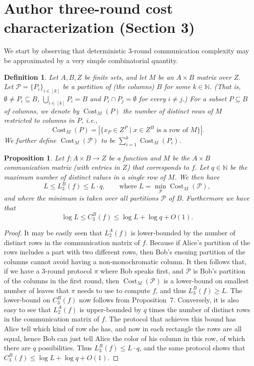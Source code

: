 \documentclass[10pt,a4paper]{article}
\newtheorem{definition}[theorem]{Definition}
\newtheorem{proposition}[theorem]{Proposition}
\begin{document}
\section*{Author three-round cost characterization (Section 3)}
We start by observing that deterministic 3-round communication complexity may be approximated by a very simple combinatorial quantity.
\begin{definition}
Let $A,B,Z$ be finite sets, and let $M$ be an $A\times B$ matrix over $Z$. Let $\mathcal P=\{P_i\}_{i\in[k]}$ be a partition of (the columns) $B$ for some $k\in\mathbb N$. (That is, $\emptyset\ne P_i\subseteq B$, $\bigcup_{i\in[k]}P_i=B$ and $P_i\cap P_j=\emptyset$ for every $i\ne j$.) For a subset $P\subseteq B$ of columns, we denote by $\operatorname{Cost}_M(P)$ the number of distinct rows of $M$ restricted to columns in $P$, i.e.,
\[\operatorname{Cost}_M(P)=|\{x_P\in Z^P\mid x\in Z^B\text{ is a row of }M\}|.\]
We further define $\operatorname{Cost}_M(\mathcal P)$ to be $\sum_{i=1}^k\operatorname{Cost}_M(P_i)$.
\end{definition}
\begin{proposition}\label{prop:cost}
Let $f:A\times B\to Z$ be a function and $M$ be the $A\times B$ communication matrix (with entries in $Z$) that corresponds to $f$. Let $q\in\mathbb N$ be the maximum number of distinct values in a single row of $M$. We then have
\[ L\le L_3^B(f)\le L\cdot q,\qquad\text{where }L=\min_{\mathcal P}\operatorname{Cost}_M(\mathcal P),\]
and where the minimum is taken over all partitions $\mathcal P$ of $B$. Furthermore we have that
\[\log L\le C_3^B(f)\le\log L+\log q+O(1).\]
\end{proposition}
\begin{proof}
It may be easily seen that $L_2^A(f)$ is lower-bounded by the number of distinct rows in the communication matrix of $f$. Because if Alice's partition of the rows includes a part with two different rows, then Bob's ensuing partition of the columns cannot avoid having a non-monochromatic column. It then follows that, if we have a 3-round protocol $\pi$ where Bob speaks first, and $\mathcal P$ is Bob's partition of the columns in the first round, then $\operatorname{Cost}_M(\mathcal P)$ is a lower-bound on smallest number of leaves that $\pi$ needs to use to compute $f$, and thus $L_3^B(f)\ge L$. The lower-bound on $C_3^B(f)$ now follows from Proposition~7.
Conversely, it is also easy to see that $L_2^A(f)$ is upper-bounded by $q$ times the number of distinct rows in the communication matrix of $f$. The protocol that achieves this bound has Alice tell which kind of row she has, and now in each rectangle the rows are all equal, hence Bob can just tell Alice the color of his column in this row, of which there are $q$ possibilities. Thus $L_3^B(f)\le L\cdot q$, and the same protocol shows that $C_3^B(f)\le\log L+\log q+O(1)$.
\end{proof}
\end{document}
